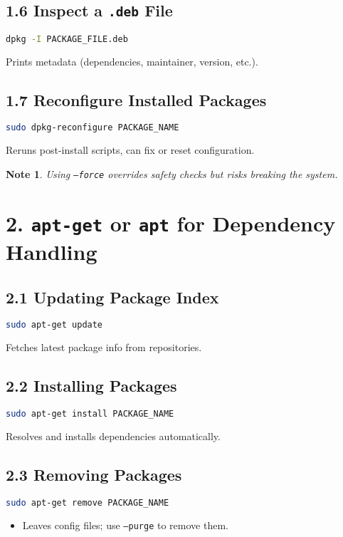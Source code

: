 \documentclass[12pt,a4paper]{report}
\newtheorem*{noteenv}{Note}
\begin{document}
\subsection*{1.6 Inspect a \texttt{.deb} File}
\begin{lstlisting}[language=bash]
dpkg -I PACKAGE_FILE.deb
\end{lstlisting}
Prints metadata (dependencies, maintainer, version, etc.).

\subsection*{1.7 Reconfigure Installed Packages}
\begin{lstlisting}[language=bash]
sudo dpkg-reconfigure PACKAGE_NAME
\end{lstlisting}
Reruns post-install scripts, can fix or reset configuration.

\begin{noteenv}
    Using \texttt{--force} overrides safety checks but risks breaking the system.
\end{noteenv}
 

\section*{2. \texttt{apt-get} or \texttt{apt} for Dependency Handling}

\subsection*{2.1 Updating Package Index}
\begin{lstlisting}[language=bash]
sudo apt-get update
\end{lstlisting}
Fetches latest package info from repositories.

\subsection*{2.2 Installing Packages}
\begin{lstlisting}[language=bash]
sudo apt-get install PACKAGE_NAME
\end{lstlisting}
Resolves and installs dependencies automatically.

\subsection*{2.3 Removing Packages}
\begin{lstlisting}[language=bash]
sudo apt-get remove PACKAGE_NAME
\end{lstlisting}
\begin{itemize}
    \item Leaves config files; use \texttt{--purge} to remove them.  
\end{itemize}
\end{document}
